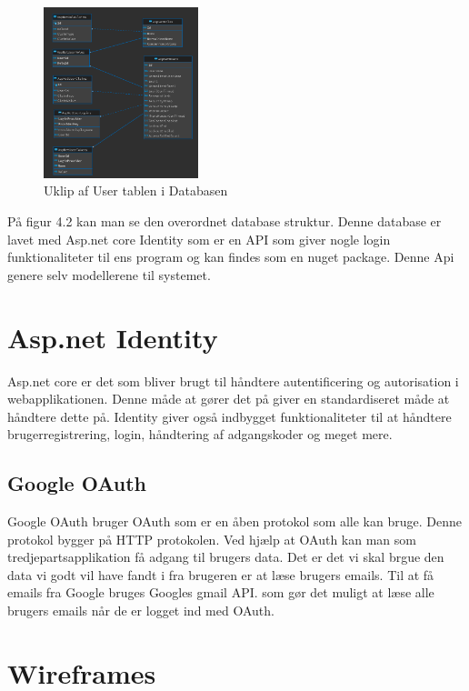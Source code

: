 \begin{figure} 
    \includegraphics[width=0.4\textwidth]{./Pictures/database-diagram.png}
    \caption{Uklip af User tablen i Databasen}
    \label{fig:databaseUserTable}
\end{figure}

På figur 4.2 kan man se den overordnet database struktur. Denne database er lavet med
Asp.net core Identity som er en API som giver nogle login funktionaliteter til ens program
og kan findes som en nuget package. Denne Api genere selv modellerene til systemet.  




\section{Asp.net Identity}
Asp.net core er det som bliver brugt til håndtere autentificering og autorisation i webapplikationen.
Denne måde at gører det på giver en standardiseret måde at håndtere dette på. Identity giver også indbygget
funktionaliteter til at håndtere brugerregistrering, login, håndtering af adgangskoder og meget mere.

\subsection{Google OAuth}
Google OAuth bruger OAuth som er en åben protokol som alle kan bruge. Denne protokol bygger på
HTTP protokolen. Ved hjælp at OAuth kan man som tredjepartsapplikation få adgang til brugers data.
Det er det vi skal brgue den data vi godt vil have fandt i fra brugeren er at læse brugers emails. 
Til at få emails fra Google bruges Googles gmail API. som gør det muligt at læse alle brugers emails når de
er logget ind med OAuth.
\newpage
\section{Wireframes}

